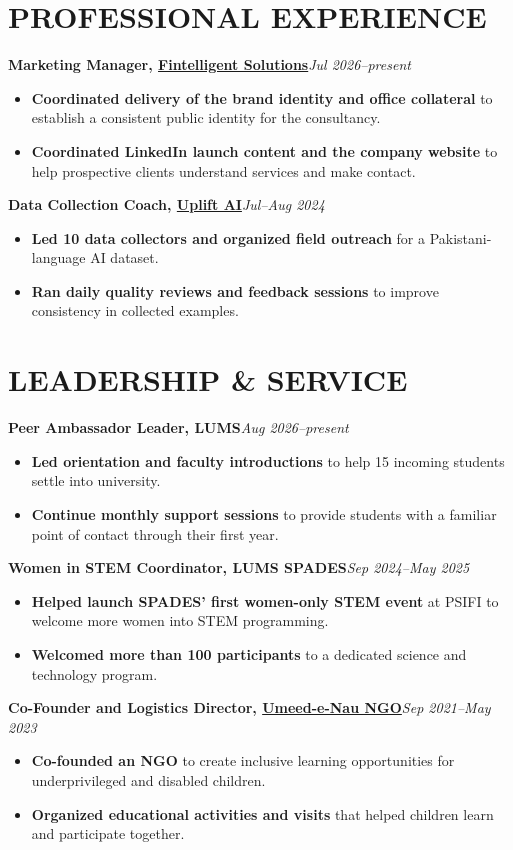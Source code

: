 \documentclass[10pt]{article}
\newcommand{\entry}[3]{\textbf{#1}\hfill {\small\itshape #2}\\[-1pt]{#3}\par}
\newcommand{\link}[2]{\href{#1}{#2}}
\begin{document}
\section*{PROFESSIONAL EXPERIENCE}
\entry{Marketing Manager, \link{https://www.fintelligent.cc/}{Fintelligent Solutions}}{Jul 2026--present}{}
\begin{itemize}
\item \textbf{Coordinated delivery of the brand identity and office collateral} to establish a consistent public identity for the consultancy.
\item \textbf{Coordinated LinkedIn launch content and the company website} to help prospective clients understand services and make contact.
\end{itemize}
\entry{Data Collection Coach, \link{https://upliftai.org/}{Uplift AI}}{Jul--Aug 2024}{}
\begin{itemize}
\item \textbf{Led 10 data collectors and organized field outreach} for a Pakistani-language AI dataset.
\item \textbf{Ran daily quality reviews and feedback sessions} to improve consistency in collected examples.
\end{itemize}
\section*{LEADERSHIP \& SERVICE}
\entry{Peer Ambassador Leader, LUMS}{Aug 2026--present}{}
\begin{itemize}
\item \textbf{Led orientation and faculty introductions} to help 15 incoming students settle into university.
\item \textbf{Continue monthly support sessions} to provide students with a familiar point of contact through their first year.
\end{itemize}
\entry{Women in STEM Coordinator, LUMS SPADES}{Sep 2024--May 2025}{}
\begin{itemize}
\item \textbf{Helped launch SPADES' first women-only STEM event} at PSIFI to welcome more women into STEM programming.
\item \textbf{Welcomed more than 100 participants} to a dedicated science and technology program.
\end{itemize}
\entry{Co-Founder and Logistics Director, \link{https://kac224.github.io/\#beyond}{Umeed-e-Nau NGO}}{Sep 2021--May 2023}{}
\begin{itemize}
\item \textbf{Co-founded an NGO} to create inclusive learning opportunities for underprivileged and disabled children.
\item \textbf{Organized educational activities and visits} that helped children learn and participate together.
\end{itemize}
\end{document}
